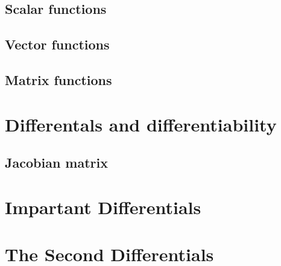 \subsection{Scalar functions}

\subsection{Vector functions}

\subsection{Matrix functions}

\section{Differentals and differentiability}

\subsection{Jacobian matrix}

\section{Impartant Differentials}




\section{The Second Differentials}






